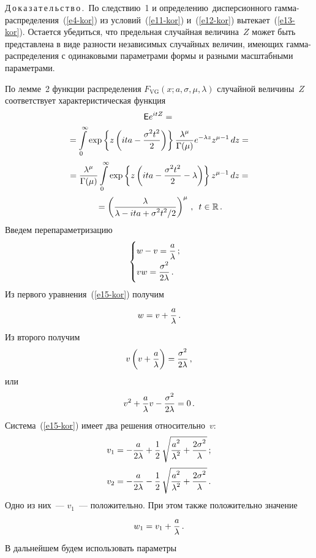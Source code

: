 \begin{multicols}{2}
\medskip

\noindent
Д\,о\,к\,а\,з\,а\,т\,е\,л\,ь\,с\,т\,в\,о\,.\ По следствию~1 и определению~дисперсионного 
гам\-ма-рас\-пре\-де\-ле\-ния~(\ref{e4-kor}) из условий~(\ref{e11-kor}) и~(\ref{e12-kor})
вытекает~(\ref{e13-kor}). Остается убедиться, что предельная случайная
величина~$Z$ может быть представлена в виде разности независимых
случайных величин, имеющих гам\-ма-рас\-пре\-де\-ле\-ния с одинаковыми
параметрами формы и разными масштабными параметрами.

По лемме~2 функции распределения $F_{\mathrm{VG}}(x;a,\sigma,\mu,\lambda)$
случайной величины~$Z$ соответствует характеристическая функция
\begin{multline}
{\sf E}e^{itZ} ={}\\
{}= \int\limits_{0}^{\infty}\exp\left \{ z\left(ita -
\fr{\sigma^{2}t^2}{2}\right) \right \}\fr{\lambda^{\mu}}{\Gamma
(\mu)}e^{-\lambda z }z^{\mu-1}\,dz ={}\\[2pt]
{}=\fr{\lambda^{\mu}}{\Gamma (\mu)} \int\limits_{0}^{\infty}\exp
\left \{ z\left (ita   - \fr{\sigma^{2}t^2}{2} - \lambda\right) \right\} 
z^{\mu-1}\,dz ={}\\[2pt]
{}=\left (\fr{\lambda}{\lambda - ita  +
\sigma^{2}t^{2}/2}\right )^{\mu}\,,\enskip
t\in\r\,.\label{e14-kor}
\end{multline}
Введем перепараметризацию
\begin{equation}
\begin{cases} 
w-v = \displaystyle\fr{a }{\lambda}\,;\\[2pt]
v w = \displaystyle\fr{\sigma^{2}}{2\lambda}\,.\end{cases} 
\label{e15-kor}
\end{equation}
Из первого уравнения~(\ref{e15-kor}) получим
$$
w = v + \fr{a }{\lambda}\,.
$$
Из второго получим
$$
v\left(v + \fr{a }{\lambda}\right) = \fr{\sigma^{2}}{2\lambda}\,,
$$
или
$$
v^{2} + \fr{a }{\lambda}v - \fr{\sigma^{2}}{2\lambda} = 0\,.
$$
Система~(\ref{e15-kor}) имеет два решения относительно~$v$:
\begin{align*}
v_{1} &= -\fr {a}{2\lambda} + \fr{1}{2}\,
\sqrt{\fr{a^{2}}{\lambda^{2}}+\fr{2\sigma^{2}}{\lambda}}\,;
\\[2pt]
v_{2} &= -\fr{a} {2\lambda} - \fr{1}{2}\,
\sqrt{\fr{a^{2}}{\lambda^{2}}+\fr{2\sigma^{2}}{\lambda}}\,.
\end{align*}
Одно из них~--- $v_1$~--- положительно. При этом также положительно
значение
$$
w_{1} = v_{1} + \fr{a }{\lambda}\,.
$$
В дальнейшем будем использовать параметры
\begin{align*}

\end{align*}
\end{multicols}

